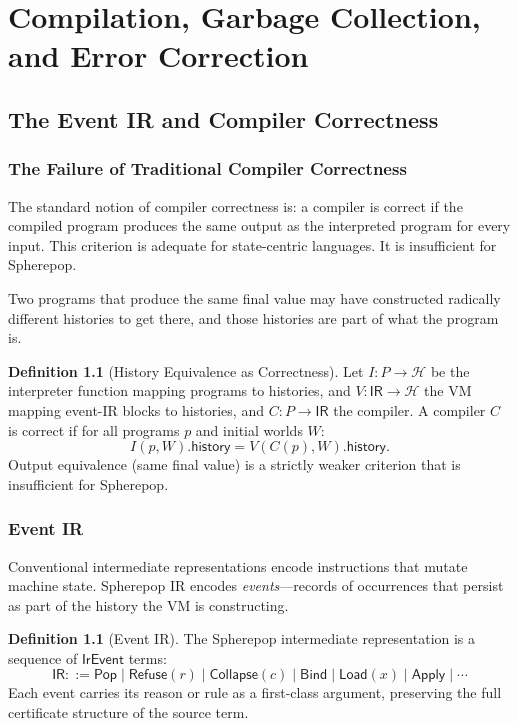 \documentclass[12pt, a4paper, openany]{book}
\theoremstyle{plain}
\theoremstyle{definition}
\newtheorem{definition}[theorem]{Definition}
\theoremstyle{remark}
\newcommand{\Pop}{\mathsf{Pop}}
\newcommand{\Refuse}{\mathsf{Refuse}}
\newcommand{\Bind}{\mathsf{Bind}}
\newcommand{\Collapse}{\mathsf{Collapse}}
\newcommand{\calH}{\mathcal{H}}
\begin{document}
\part{Compilation, Garbage Collection, and Error Correction}

\chapter{The Event IR and Compiler Correctness}

\section{The Failure of Traditional Compiler Correctness}

The standard notion of compiler correctness is: a compiler is correct if the
compiled program produces the same output as the interpreted program for every
input. This criterion is adequate for state-centric languages. It is insufficient
for Spherepop.

Two programs that produce the same final value may have constructed radically
different histories to get there, and those histories are part of what the program
is.

\begin{definition}[History Equivalence as Correctness]
Let $I : P \to \calH$ be the interpreter function mapping programs to histories,
and $V : \mathsf{IR} \to \calH$ the VM mapping event-IR blocks to histories,
and $C : P \to \mathsf{IR}$ the compiler. A compiler $C$ is correct if for all
programs $p$ and initial worlds $W$:
\[
I(p, W).\mathsf{history} = V(C(p), W).\mathsf{history}.
\]
Output equivalence (same final value) is a strictly weaker criterion that is
insufficient for Spherepop.
\end{definition}

\section{Event IR}

Conventional intermediate representations encode instructions that mutate machine
state. Spherepop IR encodes \emph{events}---records of occurrences that persist
as part of the history the VM is constructing.

\begin{definition}[Event IR]
The Spherepop intermediate representation is a sequence of $\mathsf{IrEvent}$
terms:
\[
\mathsf{IR} ::= \Pop \mid \Refuse(r) \mid \Collapse(c) \mid \Bind \mid \mathsf{Load}(x) \mid \mathsf{Apply} \mid \cdots
\]
Each event carries its reason or rule as a first-class argument, preserving the
full certificate structure of the source term.
\end{definition}
\end{document}
